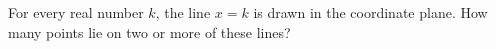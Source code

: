 For every real number $k$, the line $x=k$ is drawn in the coordinate plane. How many points lie on two or more of these lines?
